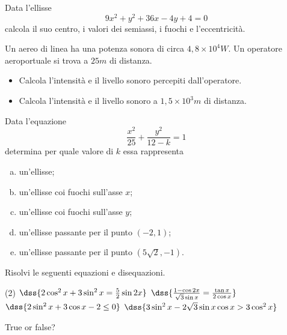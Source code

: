 \documentclass[senzagrazie]{verifica}
\begin{document}

\lineanome
\intestazionerighe

\begin{esercizi}

\item Data l'ellisse
\[
  9x^2+y^2+36x-4y+4=0
\]
calcola il suo centro, i valori dei semiassi, i fuochi e l'eccentricità.

\item Un aereo di linea ha una potenza sonora di circa
      $4,8\times 10^4\unit{W}$. Un operatore aeroportuale si trova
      a $25\unit{m}$ di distanza.
\begin{itemize}
  \item Calcola l'intensità e il livello sonoro percepiti dall'operatore.
  \item Calcola l'intensità e il livello sonoro a $1,5\times 10^3\unit{m}$
        di distanza.
\end{itemize}

\item Data l'equazione
\[
  \frac{x^2}{25}+\frac{y^2}{12-k}=1
\]
determina per quale valore di $k$ essa rappresenta
\begin{enumerate}[a)]
  \item un'ellisse;
  \item un'ellisse coi fuochi sull'asse $x$;
  \item un'ellisse coi fuochi sull'asse $y$;
  \item un'ellisse passante per il punto $(-2, 1)$;
  \item un'ellisse passante per il punto $(5\sqrt{2},-1)$.
\end{enumerate}

\item Risolvi le seguenti equazioni e disequazioni.
\begin{tasks}[after-item-skip=2em,column-sep=2em,item-indent=2em](2)
  \task $\dss{2\cos^2 x +3\sin^2 x=\frac{5}{2}\sin 2x}$
  \task $\dss{\frac{1 -\cos 2x}{\sqrt{3}\sin x}=\frac{\tan x}{2\cos x}}$
  \task $\dss{2\sin^2 x +3\cos x -2 \le 0}$
  \task $\dss{3\sin^2 x -2\sqrt{3}\sin x\cos x > 3\cos^2 x}$
\end{tasks}

\item \begin{otherlanguage}{english}
True or false?
\begin{test-verofalso}
\end{test-verofalso}
\end{otherlanguage}

\end{esercizi}
\end{document}
